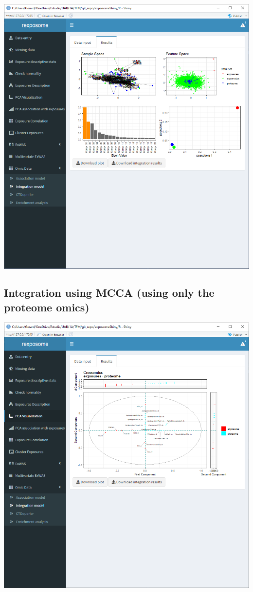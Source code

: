 \documentclass[
]{book}
\begin{document}
\includegraphics{images/analysis12_3.png}

\hypertarget{integration-using-mcca-using-only-the-proteome-omics}{%
\subsection{Integration using MCCA (using only the proteome omics)}\label{integration-using-mcca-using-only-the-proteome-omics}}

\includegraphics{images/analysis12_4.png}
\end{document}
